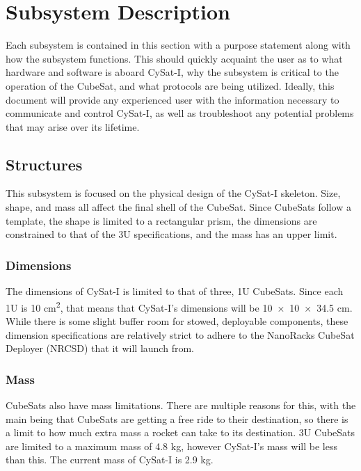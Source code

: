 \documentclass[12pt]{article}
\begin{document}
\section{Subsystem Description}

Each subsystem is contained in this section with a purpose statement along with how the subsystem functions. This should quickly acquaint the user as to what hardware and software is aboard CySat-I, why the subsystem is critical to the operation of the CubeSat, and what protocols are being utilized. Ideally, this document will provide any experienced user with the information necessary to communicate and control CySat-I, as well as troubleshoot any potential problems that may arise over its lifetime.

\subsection{Structures}

This subsystem is focused on the physical design of the CySat-I skeleton. Size, shape, and mass all affect the final shell of the CubeSat. Since CubeSats follow a template, the shape is limited to a rectangular prism, the dimensions are constrained to that of the 3U specifications, and the mass has an upper limit.

\subsubsection{Dimensions}

The dimensions of CySat-I is limited to that of three, 1U CubeSats. Since each 1U is 10 \si{\centi\meter\squared}, that means that CySat-I's dimensions will be \num{10 x 10 x 34.5} \si{\centi\meter}. While there is some slight buffer room for stowed, deployable components, these dimension specifications are relatively strict to adhere to the NanoRacks CubeSat Deployer (NRCSD) that it will launch from.

\subsubsection{Mass}

CubeSats also have mass limitations. There are multiple reasons for this, with the main being that CubeSats are getting a free ride to their destination, so there is a limit to how much extra mass a rocket can take to its destination. 3U CubeSats are limited to a maximum mass of 4.8 \si{\kilo\gram}, however CySat-I's mass will be less than this. The current mass of CySat-I is 2.9 \si{\kilo\gram}.
\end{document}
